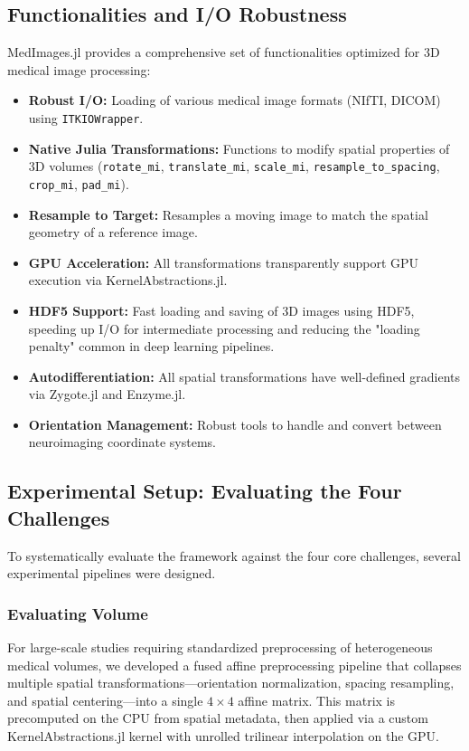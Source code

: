 \documentclass[10pt,letterpaper]{article}
\begin{document}
\subsection*{Functionalities and I/O Robustness}
MedImages.jl provides a comprehensive set of functionalities optimized for 3D medical image processing:
\begin{itemize}
    \item \textbf{Robust I/O:} Loading of various medical image formats (NIfTI, DICOM) using \texttt{ITKIOWrapper}.
    \item \textbf{Native Julia Transformations:} Functions to modify spatial properties of 3D volumes (\texttt{rotate\_mi}, \texttt{translate\_mi}, \texttt{scale\_mi}, \texttt{resample\_to\_spacing}, \texttt{crop\_mi}, \texttt{pad\_mi}).
    \item \textbf{Resample to Target:} Resamples a moving image to match the spatial geometry of a reference image.
    \item \textbf{GPU Acceleration:} All transformations transparently support GPU execution via KernelAbstractions.jl.
    \item \textbf{HDF5 Support:} Fast loading and saving of 3D images using HDF5, speeding up I/O for intermediate processing and reducing the "loading penalty" common in deep learning pipelines.
    \item \textbf{Autodifferentiation:} All spatial transformations have well-defined gradients via Zygote.jl and Enzyme.jl.
    \item \textbf{Orientation Management:} Robust tools to handle and convert between neuroimaging coordinate systems.
\end{itemize}

\subsection*{Experimental Setup: Evaluating the Four Challenges}
To systematically evaluate the framework against the four core challenges, several experimental pipelines were designed.

\subsubsection*{Evaluating Volume}
For large-scale studies requiring standardized preprocessing of heterogeneous medical volumes, we developed a fused affine preprocessing pipeline that collapses multiple spatial transformations---orientation normalization, spacing resampling, and spatial centering---into a single $4 \times 4$ affine matrix. This matrix is precomputed on the CPU from spatial metadata, then applied via a custom KernelAbstractions.jl kernel with unrolled trilinear interpolation on the GPU.
\end{document}

